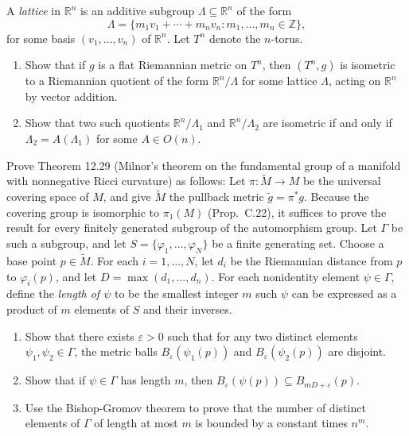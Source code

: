\begin{exercise}
\label{prob:lattices-flat-tori}
A \emph{lattice} in $\mathbb{R}^n$ is an additive subgroup $\Lambda \subseteq \mathbb{R}^n$ of the form
\[
\Lambda = \{m_1 v_1 + \cdots + m_n v_n : m_1, \ldots, m_n \in \mathbb{Z}\},
\]
for some basis $(v_1, \ldots, v_n)$ of $\mathbb{R}^n$. Let $T^n$ denote the $n$-torus.
\begin{enumerate}
\item[(a)] Show that if $g$ is a flat Riemannian metric on $T^n$, then $(T^n, g)$ is isometric to a Riemannian quotient of the form $\mathbb{R}^n/\Lambda$ for some lattice $\Lambda$, acting on $\mathbb{R}^n$ by vector addition.
\item[(b)] Show that two such quotients $\mathbb{R}^n/\Lambda_1$ and $\mathbb{R}^n/\Lambda_2$ are isometric if and only if $\Lambda_2 = A(\Lambda_1)$ for some $A \in O(n)$.
\end{enumerate}
\end{exercise}

\begin{exercise}\label{prob:milnor-fundamental-group}
Prove Theorem 12.29 (Milnor's theorem on the fundamental group of a manifold with nonnegative Ricci curvature) as follows: Let $\pi : \tilde{M} \to M$ be the universal covering space of $M$, and give $\tilde{M}$ the pullback metric $\tilde{g} = \pi^* g$.
Because the covering group is isomorphic to $\pi_1(M)$ (Prop.\ C.22), it suffices to prove the result for every finitely generated subgroup of the automorphism group. Let $\Gamma$ be such a subgroup, and let $S = \{\varphi_1, \ldots, \varphi_N\}$ be a finite generating set. Choose a base point $p \in \tilde{M}$. For each $i = 1, \ldots, N$, let $d_i$ be the Riemannian distance from $p$ to $\varphi_i(p)$, and let $D = \max(d_1, \ldots, d_n)$.
For each nonidentity element $\psi \in \Gamma$, define the \emph{length of $\psi$} to be the smallest integer $m$ such $\psi$ can be expressed as a product of $m$ elements of $S$ and their inverses.

\begin{enumerate}[label=(\alph*)]
\item Show that there exists $\varepsilon > 0$ such that for any two distinct elements $\psi_1, \psi_2 \in \Gamma$, the metric balls $B_\varepsilon(\psi_1(p))$ and $B_\varepsilon(\psi_2(p))$ are disjoint.
\item Show that if $\psi \in \Gamma$ has length $m$, then $B_\varepsilon(\psi(p)) \subseteq B_{mD+\varepsilon}(p)$.
\item Use the Bishop-Gromov theorem to prove that the number of distinct elements of $\Gamma$ of length at most $m$ is bounded by a constant times $n^m$.
\end{enumerate}
\end{exercise}

